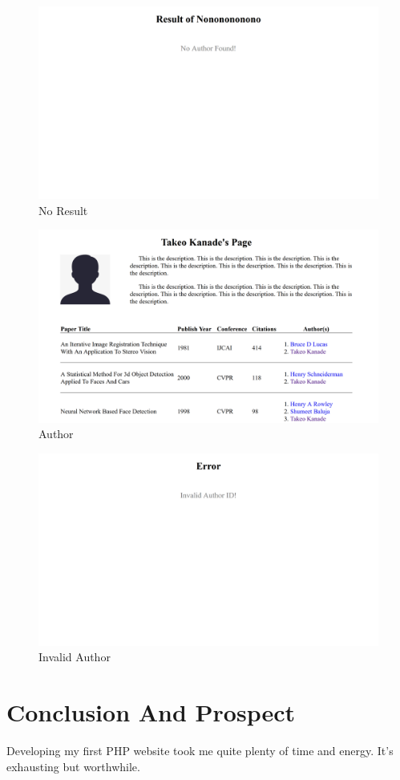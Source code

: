 \documentclass[a4paper]{article}
\begin{document}
        \begin{figure}[H]
            \centering
            \includegraphics[width=.8\textwidth]{img/4.png}
            \caption{No Result}
        \end{figure}
        \begin{figure}[H]
            \centering
            \includegraphics[width=.8\textwidth]{img/5.png}
            \caption{Author}
        \end{figure}
        \begin{figure}[H]
            \centering
            \includegraphics[width=.8\textwidth]{img/6.png}
            \caption{Invalid Author}
        \end{figure}
    \section{Conclusion And Prospect}
Developing my first PHP website took me quite plenty of time and energy. It's exhausting but worthwhile.
\end{document}
